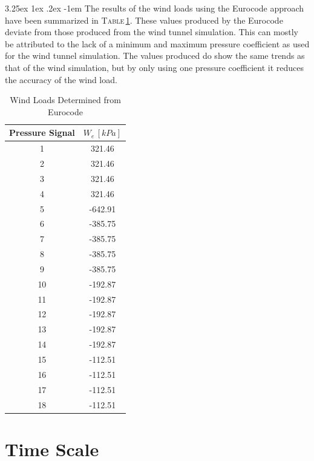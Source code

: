 \documentclass[11pt,a4paper,titlepage]{report}
\makeatletter
\renewcommand\paragraph{\@startsection{paragraph}{5}{\z@}%
  {3.25ex \@plus1ex \@minus.2ex}%
  {-1em}%
  {\normalfont\normalsize\bfseries}}
\makeatother
\begin{document}
\paragraph{}The results of the wind loads using the Eurocode approach have been summarized in \textsc{Table}\,\ref{tab:wind load EC}. These values produced by the Eurocode deviate from those produced from the wind tunnel simulation. This can mostly be attributed to the lack of a minimum and maximum pressure coefficient as used for the wind tunnel simulation. The values produced do show the same trends as that of the wind simulation, but by only using one pressure coefficient it reduces the accuracy of the wind load. 
\begin{table}[h]
    \centering
    \begin{tabular}{c|c}
       Pressure Signal & $W_e\,[kPa]$ \\
       \hline
    1  & 321.46  \\
2  & 321.46  \\
3  & 321.46  \\
4  & 321.46  \\
5  & -642.91 \\
6  & -385.75 \\
7  & -385.75 \\
8  & -385.75 \\
9  & -385.75 \\
10 & -192.87 \\
11 & -192.87 \\
12 & -192.87 \\
13 & -192.87 \\
14 & -192.87 \\
15 & -112.51 \\
16 & -112.51 \\
17 & -112.51 \\
18 & -112.51
    \end{tabular}
    \caption{Wind Loads Determined from Eurocode}
    \label{tab:wind load EC}
\end{table}
\section{Time Scale}
\end{document}
